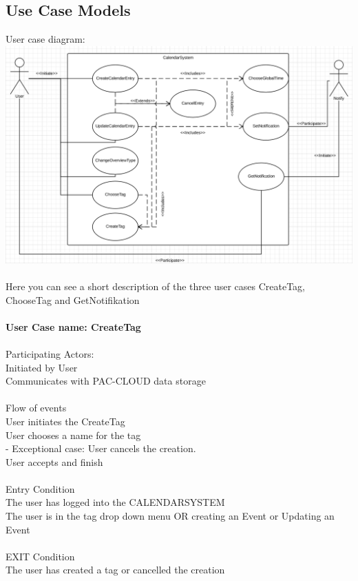\subsection{Use Case Models}
User case diagram:\\
\includegraphics[scale=0.6]{CalendarSystemUseCaseDiagram}\\\\
Here you can see a short description of the three user cases CreateTag, ChooseTag and GetNotifikation\\\\
\textbf{User Case name: CreateTag}\\
\HRule \\[0.4cm]
Participating Actors:\\
Initiated by User\\
Communicates with PAC-CLOUD data storage\\
\HRule \\[0.4cm]
Flow of events\\
User initiates the CreateTag\\
User chooses a name for the tag\\
 - Exceptional case: User cancels the creation.\\
User accepts and finish\\
\HRule \\[0.4cm]
Entry Condition\\
The user has logged into the CALENDARSYSTEM\\
The user is in the tag drop down menu OR creating an Event or Updating an Event\\
\HRule \\[0.4cm]
EXIT Condition\\
The user has created a tag or cancelled the creation\\\\\\
